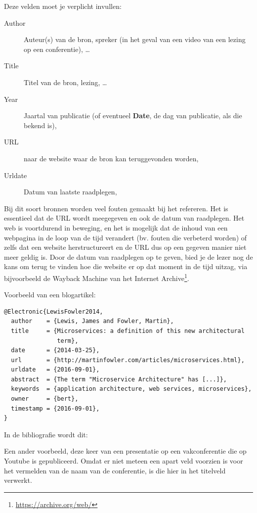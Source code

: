 Deze velden moet je verplicht invullen:

\begin{description}
  \item[Author] Auteur(s) van de bron, spreker (in het geval van een video van een lezing op een conferentie), \ldots
  \item[Title] Titel van de bron, lezing, \ldots
  \item[Year] Jaartal van publicatie (of eventueel \textbf{Date}, de dag van publicatie, als die bekend is),
  \item[URL] naar de website waar de bron kan teruggevonden worden,
  \item[Urldate] Datum van laatste raadplegen,
\end{description}

Bij dit soort bronnen worden veel fouten gemaakt bij het refereren. Het is essentieel dat de URL wordt meegegeven en ook de datum van raadplegen. Het web is voortdurend in beweging, en het is mogelijk dat de inhoud van een webpagina in de loop van de tijd verandert (bv. fouten die verbeterd worden) of zelfs dat een website herstructureert en de URL dus op een gegeven manier niet meer geldig is. Door de datum van raadplegen op te geven, bied je de lezer nog de kans om terug te vinden hoe die website er op dat moment in de tijd uitzag, via bijvoorbeeld de Wayback Machine van het Internet Archive\footnote{\url{https://archive.org/web/}}.

Voorbeeld van een blogartikel:

\begin{verbatim}
@Electronic{LewisFowler2014,
  author    = {Lewis, James and Fowler, Martin},
  title     = {Microservices: a definition of this new architectural
               term},
  date      = {2014-03-25},
  url       = {http://martinfowler.com/articles/microservices.html},
  urldate   = {2016-09-01},
  abstract  = {The term "Microservice Architecture" has [...]},
  keywords  = {application architecture, web services, microservices},
  owner     = {bert},
  timestamp = {2016-09-01},
}
\end{verbatim}

In de bibliografie wordt dit: 

Een ander voorbeeld, deze keer van een presentatie op een vakconferentie die op Youtube is gepubliceerd. Omdat er niet meteen een apart veld voorzien is voor het vermelden van de naam van de conferentie, is die hier in het titelveld verwerkt.

